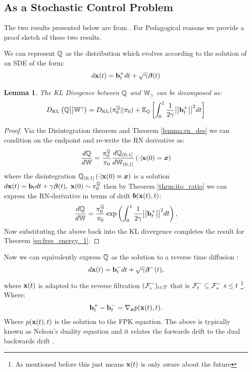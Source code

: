 \documentclass[a4paper,12pt,twoside,openright]{report}
\newtheorem{lemma}[theorem]{Lemma}
\theoremstyle{definition}
\begin{document}
\subsection{As a Stochastic Control Problem}

The two results presented below are from \cite{pavon1991free}. For Pedagogical reasons we provide a proof sketch of these two results.

We can represent ${\mathbb{Q}}$ as the distribution which evolves according to the solution of an SDE of the form:
\begin{align*}
    d{\mathbf{x}}(t) = {\mathbf{b}}^{+}_t dt + \sqrt{\gamma} {\bm{\beta}}(t)
\end{align*}
\begin{lemma}\citep{pavon1991free}
    The KL Divegence between ${\mathbb{Q}}$ and $\mathbb{W}_{\gamma}$ can be decomposed as:
\begin{align}\label{eq:free_energy_1}
     D_{\mathrm{KL}}\left({\mathbb{Q}} \big|\big| \mathbb{W}^{\gamma}\right) = D_{\mathrm{KL}}(\pi^{{\mathbb{Q}}}_0 || \pi_0) + \mathbb{E}_{\mathbb{Q}}\left[\int_0^1 \frac{1}{2\gamma}\big|\big|{\mathbf{b}}^{+}_t \big|\big|^2 dt\right]
\end{align}
\end{lemma}
\begin{proof}
Via the Disintegration theorem and Theorem \ref{lemma:rn_des} we can condition on the endpoint and re-write the RN derivative as:
\begin{align*}
    \frac{d{\mathbb{Q}}}{d\mathbb{W}} = \frac{\pi_0^{\mathbb{Q}}}{\pi_0} \frac{d{\mathbb{Q}}_{(0,1]}}{d\mathbb{W}_{(0,1]}}\left(\cdot | {\mathbf{x}}(0) ={\bm{x}}\right)
\end{align*}
where the disintegration ${\mathbb{Q}}_{(0,1]}\left(\cdot | {\mathbf{x}}(0) = {\bm{x}} \right)$ is a solution $d{\mathbf{x}}(t) = {\mathbf{b}}_t dt + \gamma {\bm{\beta}}(t), \; {\mathbf{x}}(0) \sim \pi_0^{\mathbb{Q}}$ then by Theorem \ref{thrm:ito_ratio} we can express the RN-derivative in terms of  drift ${\bm{b}}({\mathbf{x}}(t), t)$:
\begin{align*}
    \frac{d{\mathbb{Q}}}{d\mathbb{W}} = \frac{\pi_0^{\mathbb{Q}}}{\pi_0}\exp\left(\int_0^1\frac{1}{2\gamma} \big|\big|{\mathbf{b}}^+_t\big|\big|^2 dt\right),
\end{align*}
Now substituting the above back into the KL divergence completes the result for Theorem \ref{eq:free_energy_1}.
\end{proof}
Now we can equivalently express ${\mathbb{Q}}$ as the solution to a reverse time diffusion :
\begin{align}
    d{\mathbf{x}}(t) = {\mathbf{b}}^{-}_tdt + \sqrt{\gamma} {\bm{\beta}}^{-}(t), 
\end{align}
where ${\mathbf{x}}(t)$ is adapted to the reverse filtration $({\mathcal{F}}^{-}_i)_{i\in T}$ that is ${\mathcal{F}}^{-}_t \subseteq {\mathcal{F}}^{-}_s \; s \leq t $ \footnote{As mentioned before this just means ${\mathbf{x}}(t)$  is only aware about the future}.  Where:
\begin{align}\label{eq:nelson}
    {{\mathbf{b}}^{+}_t - {\mathbf{b}}^{-}_t} = \nabla_{{\bm{x}}} p({\mathbf{x}}(t), t).
\end{align}
Where $p({\mathbf{x}}(t), t)$ is the solution to the FPK equation. The above is typically known as Nelson's duality equation and it relates the forwards drift to the dual backwards drift \citep{nelson1967dynamical}. 
\end{document}
